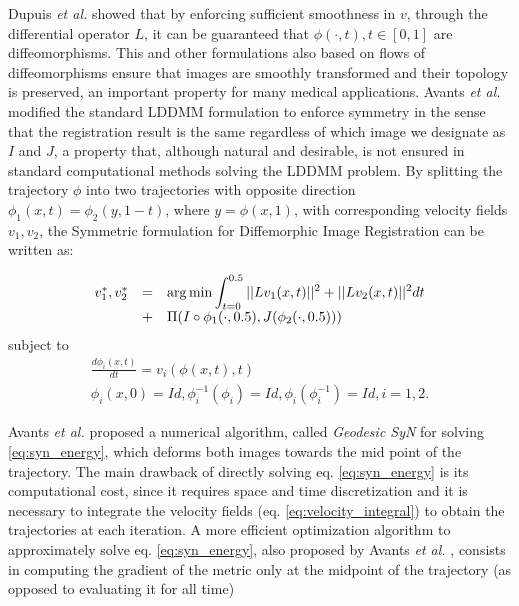 Dupuis {\it et al.} \cite{Dupuis1998} showed that by enforcing sufficient smoothness
in $v$, through the differential operator $L$, it can be guaranteed that $\phi(\cdot, t), t \in [0, 1]$ are diffeomorphisms. This and other formulations also based on flows of
diffeomorphisms ensure that images are smoothly transformed and their topology is preserved, an important property for many medical applications. Avants {\it et al.} \cite{Avants2008}
\cite{Avants2011} modified the standard LDDMM formulation to enforce symmetry in the sense that the registration result is the same regardless of which image we designate as $I$
and $J$, a property that, although natural and desirable, is not ensured in standard computational methods solving the LDDMM problem. By splitting the trajectory $\phi$ into two
trajectories with opposite direction $\phi_{1}(x, t) = \phi_{2}(y, 1-t)$, where $y = \phi(x, 1)$, with corresponding velocity fields $v_{1}, v_{2}$, the Symmetric formulation
for Diffemorphic Image Registration \cite{Avants2008}\cite{Avants2011} can be written as:

\begin{equation}\label{eq:syn_energy}
    \begin{array}{lll}
        v_{1}^{*}, v_{2}^{*} &=& \mathlarger{\arg \min \int_{t=0}^{0.5} ||L v_{1}(x, t)||^{2} + ||L v_{2}(x, t)||^{2} dt}\\
        &+& \mathlarger{ \Pi(I \circ \phi_{1}(\cdot, 0.5), J(\phi_{2}(\cdot, 0.5)))}
    \end{array}
\end{equation}
subject to
\begin{equation}\label{eq:syn_energy_constraints}
    \begin{array}{l}
        \frac{d\phi_{i}(x, t)}{dt} = v_{i}(\phi(x,t),t)\\
        \phi_{i}(x, 0) = Id, \phi_{i}^{-1}(\phi_{i}) = Id, \phi_{i}(\phi_{i}^{-1}) = Id, i=1,2.
    \end{array}
\end{equation}

Avants {\it et al.} \cite{Avants2006} proposed a numerical algorithm, called \textit{Geodesic SyN} for solving \ref{eq:syn_energy}, which deforms both images towards the mid point of
the trajectory. The main drawback of directly solving eq. \ref{eq:syn_energy} is its computational cost, since it requires space and time discretization and
it is necessary to integrate the velocity fields (eq. \ref{eq:velocity_integral}) to obtain the trajectories at each iteration. A more efficient optimization algorithm
to approximately solve eq. \ref{eq:syn_energy}, also proposed by Avants {\it et al.} \cite{Avants2008}\cite{Avants2011}, consists in computing the gradient of the metric only at the
midpoint of the trajectory (as opposed to evaluating it for all time)

